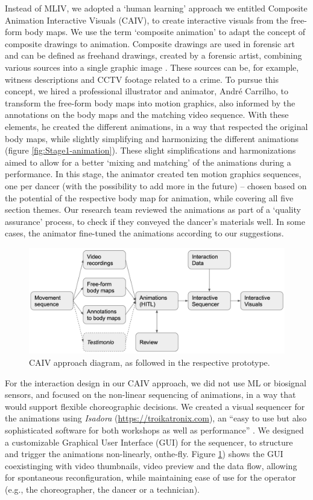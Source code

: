 Instead of MLIV, we adopted a ‘human learning’ approach we entitled Composite Animation Interactive Visuals (CAIV), to create interactive visuals from the free-form body maps. We use the term ‘composite animation’ to adapt the concept of composite drawings to animation. Composite drawings are used in forensic art and can be defined as freehand drawings, created by a forensic artist, combining various sources into a single graphic image \cite{stewart_forensic_2015}. These sources can be, for example, witness descriptions and CCTV footage related to a crime. To pursue this concept, we hired a professional illustrator and animator, André Carrilho, to transform the free-form body maps into motion graphics, also informed by the annotations on the body maps and the matching video sequence. With these elements, he created the different animations, in a way that respected the original body maps, while slightly simplifying and harmonizing the different animations (figure \ref{fig:Stage1-animation}). These slight simplifications and harmonizations aimed to allow for a better ‘mixing and matching’ of the animations during a performance. In this stage, the animator created ten motion graphics sequences, one per dancer (with the possibility to add more in the future) – chosen based on the potential of the respective body map for animation, while covering all five section themes. Our research team reviewed the animations as part of a ‘quality assurance’ process, to check if they conveyed the dancer’s materials well. In some cases, the animator fine-tuned the animations according to our suggestions.

\begin{figure}[ht]
  \centering
  \includegraphics[width=0.7\linewidth]{Chapters/Figures/modi_dis/hitl-model.png}
  \caption{CAIV approach diagram, as followed in the respective prototype.}
    \label{fig:hitl-model}
\end{figure}

For the interaction design in our CAIV approach, we did not use ML or biosignal sensors, and focused on the non-linear sequencing of animations, in a way that would support flexible choreographic decisions. We created a visual sequencer for the animations using \textit{Isadora} (\url{https://troikatronix.com}), an “easy to use but also sophisticated software for both workshops as well as performance” \cite{delahunta_isadora_2005}. We designed a customizable Graphical User Interface (GUI) for the sequencer, to structure and trigger the animations non-linearly, onthe-fly. Figure \ref{fig:hitl-model}) shows the GUI coexistinging with video thumbnails, video preview and the data flow, allowing for spontaneous reconfiguration, while maintaining ease of use for the operator (e.g., the choreographer, the dancer or a technician).

